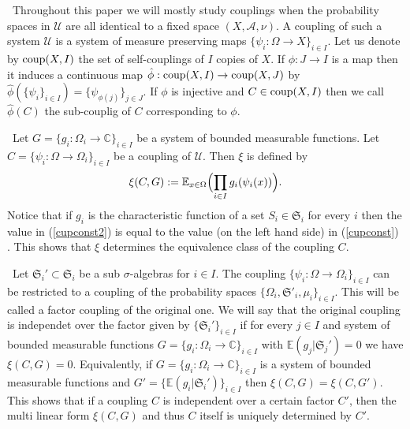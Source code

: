 \documentclass [11pt] {article}
\begin{document}
\bigskip


~Throughout this paper we will mostly study couplings when the probability spaces in $\mathcal{U}$ are all identical to a fixed space $(X,\mathcal{A},\nu)$. A coupling of such a system $\mathcal{U}$ is a system of measure preserving maps $\{\psi_i:\Omega\rightarrow X\}_{i\in I}$. Let us denote by ${\rm coup}(X,I)$ the set of self-couplings of $I$ copies of $X$. If $\phi:J\rightarrow I$ is a map then it induces a continuous map $\hat{\phi}:{\rm coup}(X,I)\rightarrow{\rm coup}(X,J)$ by $\hat{\phi}(\{\psi_i\}_{i\in I})=\{\psi_{\phi(j)}\}_{j\in J}$. If $\phi$ is injective and
 $C\in{\rm coup}(X,I)$ then we call $\hat{\phi}(C)$ the sub-couplig of $C$ corresponding to $\phi$.

\bigskip

~Let $G=\{g_i:\Omega_i\rightarrow\mathbb{C}\}_{i\in I}$ be a system of bounded measurable functions. Let $C=\{\psi_i:\Omega\rightarrow\Omega_i\}_{i\in I}$ be a coupling of $\mathcal{U}$. 
Then $\xi$ is defined by
\begin{equation}\label{cupconst2}
\xi(C,G):=\mathbb{E}_{x\in\Omega}\Bigl(\prod_{i\in I} g_i(\psi_i(x))\Bigr).
\end{equation}
Notice that if $g_i$ is the characteristic function of a set $S_i\in\mathfrak{S}_i$ for every $i$ then the value in (\ref{cupconst2}) is equal to the value (on the left hand side) in (\ref{cupconst}) . This shows that $\xi$ determines the equivalence class of the coupling $C$.

\bigskip

~Let $\mathfrak{S}_i'\subset\mathfrak{S}_i$ be a sub $\sigma$-algebras for $i\in I$. The coupling $\{\psi_i:\Omega\rightarrow\Omega_i\}_{i\in I}$ can be restricted to a coupling of the probability spaces $\{\Omega_i,\mathfrak{S}'_i,\mu_i\}_{i\in I}$. This will be called a factor coupling of the original one. We will say that the original coupling is independet over the factor given by $\{\mathfrak{S}_i'\}_{i\in I}$ if for every $j\in I$ and system of bounded measurable functions $G=\{g_i:\Omega_i\rightarrow\mathbb{C}\}_{i\in I}$ with $\mathbb{E}(g_j|\mathfrak{S}_j')=0$ we have $\xi(C,G)=0$. Equivalently, if $G=\{g_i:\Omega_i\rightarrow\mathbb{C}\}_{i\in I}$ is a system of bounded measurable functions and $G'=\{\mathbb{E}(g_i|\mathfrak{S}_i')\}_{i\in I}$ then $\xi(C,G)=\xi(C,G')$. This shows that if a coupling $C$ is independent over a certain factor $C'$, then the multi linear form $\xi(C,G)$ and thus $C$ itself is uniquely determined by $C'$.
\end{document}
